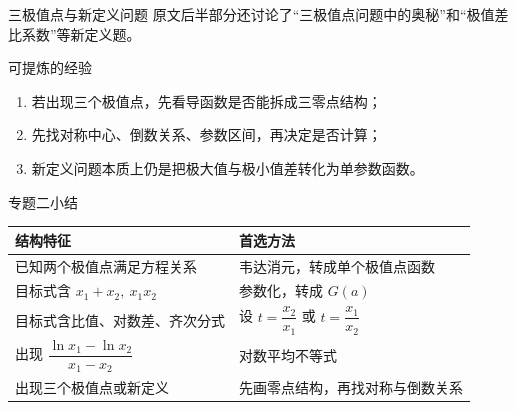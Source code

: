 ﻿\documentclass[aspectratio=169,11pt]{ctexbeamer}
\begin{document}
\begin{frame}{三极值点与新定义问题}
\small
原文后半部分还讨论了“三极值点问题中的奥秘”和“极值差比系数”等新定义题。

\begin{block}{可提炼的经验}
\begin{enumerate}
  \item 若出现三个极值点，先看导函数是否能拆成三零点结构；
  \item 先找对称中心、倒数关系、参数区间，再决定是否计算；
  \item 新定义问题本质上仍是把极大值与极小值差转化为单参数函数。
\end{enumerate}
\end{block}
\end{frame}

\begin{frame}{专题二小结}
\small
\begin{center}
\renewcommand{\arraystretch}{1.35}
\begin{tabular}{>{\raggedright\arraybackslash}p{} >{\raggedright\arraybackslash}p{}}
\toprule
结构特征 & 首选方法 \\
\midrule
已知两个极值点满足方程关系 & 韦达消元，转成单个极值点函数 \\
目标式含 $x_1+x_2,\ x_1x_2$ & 参数化，转成 $G(a)$ \\
目标式含比值、对数差、齐次分式 & 设 $t=\dfrac{x_2}{x_1}$ 或 $t=\dfrac{x_1}{x_2}$ \\
出现 $\dfrac{\ln x_1-\ln x_2}{x_1-x_2}$ & 对数平均不等式 \\
出现三个极值点或新定义 & 先画零点结构，再找对称与倒数关系 \\
\bottomrule
\end{tabular}
\end{center}
\end{frame}
\end{document}
